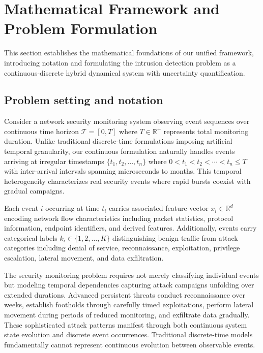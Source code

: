 \documentclass[10pt,journal,compsoc]{IEEEtran}
\newcommand{\R}{\mathbb{R}}
\begin{document}
\section{Mathematical Framework and Problem Formulation}
\label{sec:framework}

This section establishes the mathematical foundations of our unified framework, introducing notation and formulating the intrusion detection problem as a continuous-discrete hybrid dynamical system with uncertainty quantification.

\subsection{Problem setting and notation}

Consider a network security monitoring system observing event sequences over continuous time horizon $\mathcal{T} = [0, T]$ where $T \in \R^+$ represents total monitoring duration. Unlike traditional discrete-time formulations imposing artificial temporal granularity, our continuous formulation naturally handles events arriving at irregular timestamps $\{t_1, t_2, \ldots, t_n\}$ where $0 < t_1 < t_2 < \cdots < t_n \leq T$ with inter-arrival intervals spanning microseconds to months. This temporal heterogeneity characterizes real security events where rapid bursts coexist with gradual campaigns.

Each event $i$ occurring at time $t_i$ carries associated feature vector $x_i \in \R^d$ encoding network flow characteristics including packet statistics, protocol information, endpoint identifiers, and derived features. Additionally, events carry categorical labels $k_i \in \{1, 2, \ldots, K\}$ distinguishing benign traffic from attack categories including denial of service, reconnaissance, exploitation, privilege escalation, lateral movement, and data exfiltration.

The security monitoring problem requires not merely classifying individual events but modeling temporal dependencies capturing attack campaigns unfolding over extended durations. Advanced persistent threats conduct reconnaissance over weeks, establish footholds through carefully timed exploitations, perform lateral movement during periods of reduced monitoring, and exfiltrate data gradually. These sophisticated attack patterns manifest through both continuous system state evolution and discrete event occurrences. Traditional discrete-time models fundamentally cannot represent continuous evolution between observable events.
\end{document}
